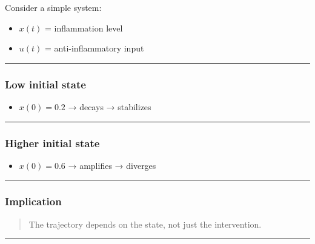 \documentclass[
  letterpaper,
  DIV=11,
  numbers=noendperiod]{scrartcl}
\providecommand{\tightlist}{%
  \setlength{\itemsep}{0pt}\setlength{\parskip}{0pt}}
\begin{document}
Consider a simple system:

\begin{itemize}
\tightlist
\item
  \(x(t)\) = inflammation level\\
\item
  \(u(t)\) = anti-inflammatory input
\end{itemize}

\begin{center}\rule{0.5\linewidth}{0.5pt}\end{center}

\subsubsection{Low initial state}\label{low-initial-state}

\begin{itemize}
\tightlist
\item
  \(x(0) = 0.2\) → decays → stabilizes
\end{itemize}

\begin{center}\rule{0.5\linewidth}{0.5pt}\end{center}

\subsubsection{Higher initial state}\label{higher-initial-state}

\begin{itemize}
\tightlist
\item
  \(x(0) = 0.6\) → amplifies → diverges
\end{itemize}

\begin{center}\rule{0.5\linewidth}{0.5pt}\end{center}

\subsubsection{Implication}\label{implication}

\begin{quote}
The trajectory depends on the state, not just the intervention.
\end{quote}

\begin{center}\rule{0.5\linewidth}{0.5pt}\end{center}
\end{document}
